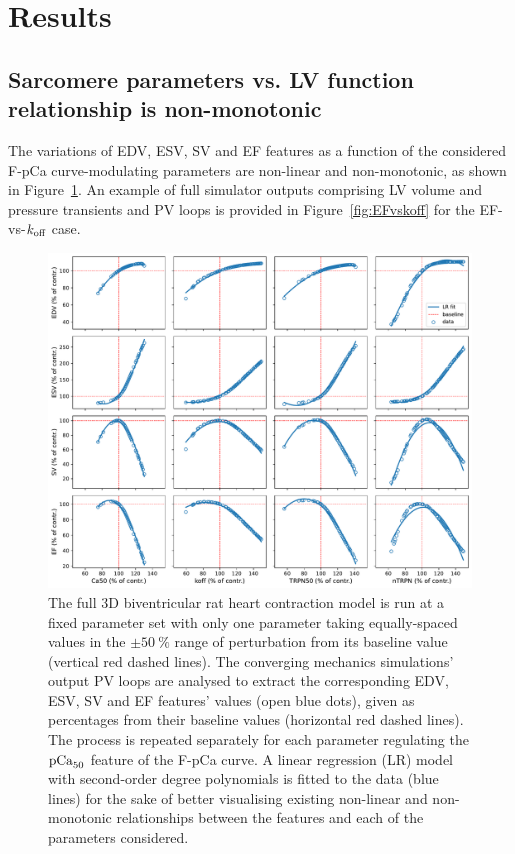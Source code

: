 %
%
%
\section{Results}


%
%
%
\subsection{Sarcomere parameters vs. LV function relationship is non-monotonic}
The variations of EDV, ESV, SV and EF features as a function of the considered F-pCa curve-modulating parameters are non-linear and non-monotonic, as shown in Figure~\ref{fig:EFvsparamsnonmonotonic}. An example of full simulator outputs comprising LV volume and pressure transients and PV loops is provided in Figure~\ref{fig:EFvskoff} for the EF-vs-$k_{\textrm{off}}$ case.

\begin{figure}[h!]
    \myfloatalign
    \includegraphics[width=\textwidth]{figures/chapter08/Fig1.pdf}
    \caption{The full $3$D biventricular rat heart contraction model is run at a fixed parameter set with only one parameter taking equally-spaced values in the $\pm\SI{50}{\percent}$ range of perturbation from its baseline value (vertical red dashed lines). The converging mechanics simulations' output PV loops are analysed to extract the corresponding EDV, ESV, SV and EF features' values (open blue dots), given as percentages from their baseline values (horizontal red dashed lines). The process is repeated separately for each parameter regulating the $\textrm{pCa}_{50}$ feature of the F-pCa curve. A linear regression (LR) model with second-order degree polynomials is fitted to the data (blue lines) for the sake of better visualising existing non-linear and non-monotonic relationships between the features and each of the parameters considered.}
    \label{fig:EFvsparamsnonmonotonic}
\end{figure}

